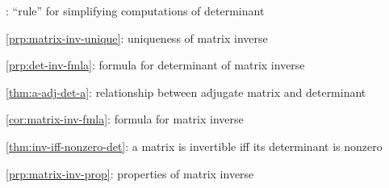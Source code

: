 \item {}: ``rule'' for simplifying computations of determinant
\item \cref{prp:matrix-inv-unique}: uniqueness of matrix inverse
\item \cref{prp:det-inv-fmla}: formula for determinant of matrix inverse
\item \cref{thm:a-adj-det-a}: relationship between adjugate matrix and determinant
\item \cref{cor:matrix-inv-fmla}: formula for matrix inverse
\item \cref{thm:inv-iff-nonzero-det}: a matrix is invertible iff its determinant is nonzero
\item \cref{prp:matrix-inv-prop}: properties of matrix inverse

